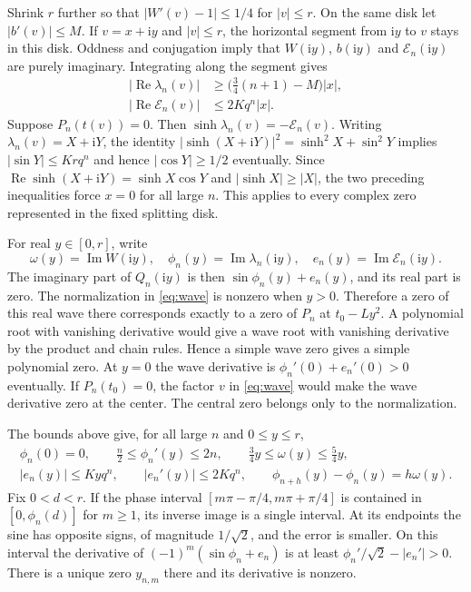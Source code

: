 \documentclass[11pt]{article}
\newcommand{\ii}{\mathrm i}
\begin{document}
Shrink $r$ further so that $|W'(v)-1|\le1/4$ for $|v|\le r$.
On the same disk let $|b'(v)|\le M$. If $v=x+\ii y$ and
$|v|\le r$, the horizontal segment from $\ii y$ to $v$ stays
in this disk. Oddness and conjugation imply that
$W(\ii y)$, $b(\ii y)$ and $\mathcal E_n(\ii y)$ are purely imaginary.
Integrating along the segment gives
\begin{align}
 |\operatorname{Re}\lambda_n(v)|
  &\ge\bigl(\tfrac34(n+1)-M\bigr)|x|,\\
 |\operatorname{Re}\mathcal E_n(v)|&\le 2Kq^n |x|.\label{eq:transverse}
\end{align}
Suppose $P_n(t(v))=0$. Then $\sinh\lambda_n(v)=-\mathcal E_n(v)$.
Writing $\lambda_n(v)=X+\ii Y$, the identity
$|\sinh(X+\ii Y)|^2=\sinh^2 X+\sin^2 Y$ implies
$|\sin Y|\le Kr q^n$ and hence $|\cos Y|\ge1/2$ eventually.
Since $\operatorname{Re}\sinh(X+\ii Y)=\sinh X\cos Y$ and
$|\sinh X|\ge|X|$, the two preceding inequalities force $x=0$ for all
large $n$. This applies to every complex zero represented in the
fixed splitting disk.

For real $y\in[0,r]$, write
\[
 \omega(y)=\operatorname{Im} W(\ii y),\quad
 \phi_n(y)=\operatorname{Im}\lambda_n(\ii y),\quad
 e_n(y)=\operatorname{Im}\mathcal E_n(\ii y).
\]
The imaginary part of $Q_n(\ii y)$ is then
$\sin\phi_n(y)+e_n(y)$, and its real part is zero. The normalization
in \eqref{eq:wave} is nonzero when $y>0$. Therefore a zero of this
real wave there corresponds exactly to a zero of $P_n$ at
$t_0-Ly^2$. A polynomial root with vanishing derivative would give
a wave root with vanishing derivative by the product and chain rules.
Hence a simple wave zero gives a simple polynomial zero.
At $y=0$ the wave derivative is $\phi_n'(0)+e_n'(0)>0$ eventually.
If $P_n(t_0)=0$, the factor $v$ in \eqref{eq:wave} would make the
wave derivative zero at the center. The central zero belongs only
to the normalization.

The bounds above give, for all large $n$ and $0\le y\le r$,
\begin{gather}
 \phi_n(0)=0,\qquad
 \frac n2\le\phi_n'(y)\le2n,\qquad
 \frac34 y\le\omega(y)\le\frac54 y,\label{eq:growth}\\
 |e_n(y)|\le Kyq^n,\qquad |e_n'(y)|\le 2K q^n,\qquad
 \phi_{n+h}(y)-\phi_n(y)=h\omega(y).\label{eq:diff}
\end{gather}
Fix $0<d<r$. If the phase interval
$[m\pi-\pi/4,m\pi+\pi/4]$ is contained in
$[0,\phi_n(d)]$ for $m\ge1$, its inverse image is a single interval.
At its endpoints the sine has opposite signs, of magnitude
$1/\sqrt2$, and the error is smaller. On this interval the derivative
of $(-1)^m(\sin\phi_n+e_n)$ is at least
$\phi_n'/\sqrt2-|e_n'|>0$. There is a unique zero $y_{n,m}$ there
and its derivative is nonzero.
\end{document}
